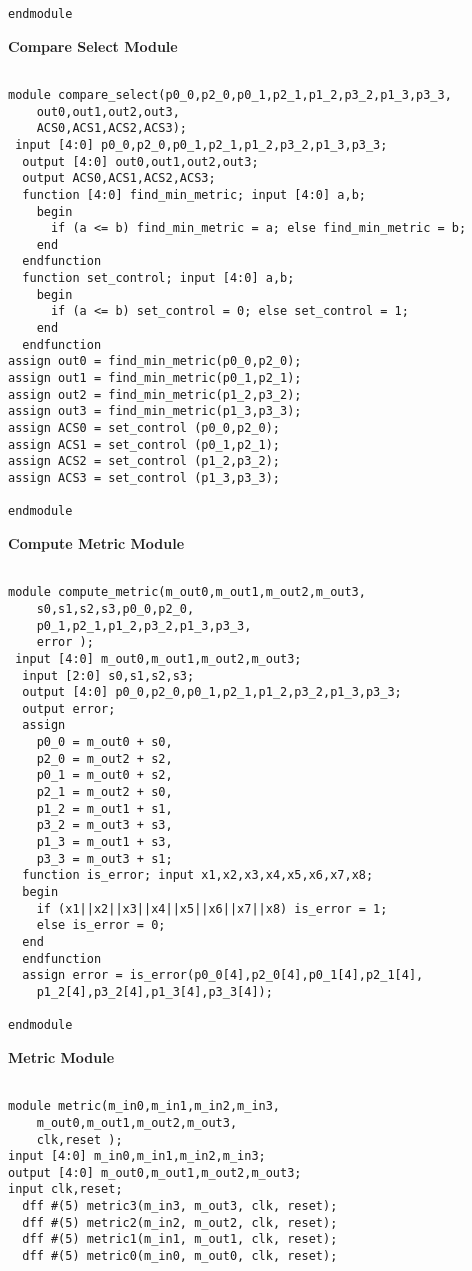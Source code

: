 \documentclass[14pt]{report}
\begin{document}
{\begin{verbatim}
endmodule

\end{verbatim}
\textbf{Compare Select Module}\\
\begin{verbatim}

module compare_select(p0_0,p2_0,p0_1,p2_1,p1_2,p3_2,p1_3,p3_3,
    out0,out1,out2,out3,
    ACS0,ACS1,ACS2,ACS3);
 input [4:0] p0_0,p2_0,p0_1,p2_1,p1_2,p3_2,p1_3,p3_3;
  output [4:0] out0,out1,out2,out3;
  output ACS0,ACS1,ACS2,ACS3;
  function [4:0] find_min_metric; input [4:0] a,b;
    begin
      if (a <= b) find_min_metric = a; else find_min_metric = b;
    end
  endfunction
  function set_control; input [4:0] a,b;
    begin
      if (a <= b) set_control = 0; else set_control = 1;
    end
  endfunction
assign out0 = find_min_metric(p0_0,p2_0);
assign out1 = find_min_metric(p0_1,p2_1);
assign out2 = find_min_metric(p1_2,p3_2);
assign out3 = find_min_metric(p1_3,p3_3);
assign ACS0 = set_control (p0_0,p2_0);
assign ACS1 = set_control (p0_1,p2_1);
assign ACS2 = set_control (p1_2,p3_2);
assign ACS3 = set_control (p1_3,p3_3);

endmodule

\end{verbatim}
\textbf{Compute Metric Module}\\
\begin{verbatim}

module compute_metric(m_out0,m_out1,m_out2,m_out3,
    s0,s1,s2,s3,p0_0,p2_0,
    p0_1,p2_1,p1_2,p3_2,p1_3,p3_3,
    error );
 input [4:0] m_out0,m_out1,m_out2,m_out3;
  input [2:0] s0,s1,s2,s3;
  output [4:0] p0_0,p2_0,p0_1,p2_1,p1_2,p3_2,p1_3,p3_3;
  output error;
  assign
    p0_0 = m_out0 + s0,
    p2_0 = m_out2 + s2,
    p0_1 = m_out0 + s2,
    p2_1 = m_out2 + s0,
    p1_2 = m_out1 + s1,
    p3_2 = m_out3 + s3,
    p1_3 = m_out1 + s3,
    p3_3 = m_out3 + s1;
  function is_error; input x1,x2,x3,x4,x5,x6,x7,x8;
  begin
    if (x1||x2||x3||x4||x5||x6||x7||x8) is_error = 1;
    else is_error = 0;
  end
  endfunction
  assign error = is_error(p0_0[4],p2_0[4],p0_1[4],p2_1[4],
    p1_2[4],p3_2[4],p1_3[4],p3_3[4]);

endmodule

\end{verbatim}
\textbf{Metric Module}\\
\begin{verbatim}

module metric(m_in0,m_in1,m_in2,m_in3,
    m_out0,m_out1,m_out2,m_out3,
    clk,reset );
input [4:0] m_in0,m_in1,m_in2,m_in3;
output [4:0] m_out0,m_out1,m_out2,m_out3;
input clk,reset;
  dff #(5) metric3(m_in3, m_out3, clk, reset);
  dff #(5) metric2(m_in2, m_out2, clk, reset);
  dff #(5) metric1(m_in1, m_out1, clk, reset);
  dff #(5) metric0(m_in0, m_out0, clk, reset);


\end{verbatim}}
\end{document}
